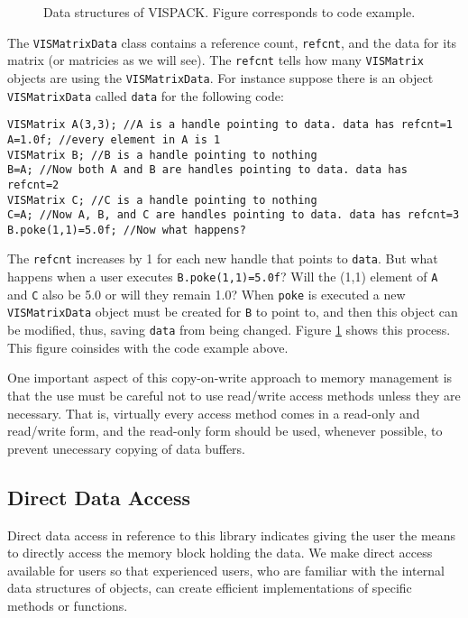 \begin{figure}
\centerline{}
\caption{Data structures of VISPACK.
Figure corresponds to code example.\label{data}}
\end{figure}
The {\tt VISMatrixData} class contains a reference count,
{\tt refcnt}, and the data for its matrix (or matricies as we will see).
The {\tt refcnt} tells how many {\tt VISMatrix} objects are using the {\tt VISMatrixData}.
For instance suppose there is an object {\tt VISMatrixData} called {\tt data}
for the following code:
\begin{list}{}{\setlength{\partopsep}{-1in}
\setlength{\topsep}{0in} \setlength{\labelwidth}{1in}
\setlength{\leftmargin}{0.5in} \setlength{\labelsep}{0.2in}}
\item {\tt VISMatrix A(3,3); //A is a handle pointing to data.
data has refcnt=1}\\
{\tt A=1.0f; //every element in A is 1}\\
{\tt VISMatrix B; //B is a handle pointing to nothing}\\
{\tt B=A; //Now both A and B are handles pointing to data.
data has refcnt=2}\\
{\tt VISMatrix C; //C is a handle pointing to nothing}\\
{\tt C=A; //Now A, B, and C are handles pointing to data.
data has refcnt=3}\\
{\tt B.poke(1,1)=5.0f; //Now what happens?}
\end{list}
The {\tt refcnt} increases by 1 for each new handle that points to {\tt data}.
But what happens when a user executes {\tt B.poke(1,1)=5.0f}?
Will the (1,1) element of {\tt A} and {\tt C} also be 5.0
or will they remain 1.0?
When {\tt poke} is executed a new {\tt VISMatrixData} object must be created for
{\tt B} to point to, and then this object can be modified, thus, saving
{\tt data} from being changed.
Figure \ref{data} shows this process.  This figure coinsides with
the code example above.

One important aspect of this copy-on-write approach to memory 
management is that the use must be careful not to use read/write 
access methods unless they are necessary.  That is, virtually every 
access method comes in a read-only and read/write form, and the 
read-only form should be used, whenever possible, to prevent 
unecessary copying of data buffers.

\subsection{Direct Data Access}
\label{dda}
Direct data access in reference to this library indicates giving the 
user the means to directly access the memory block holding the data.  
We make direct access available for users so that 
experienced users, who are familiar with the internal data structures 
of objects, can create efficient implementations of specific methods 
or functions.

